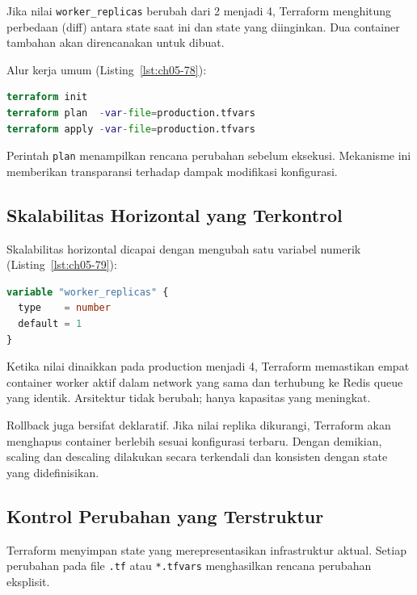 Jika nilai \texttt{worker\_replicas} berubah dari 2 menjadi 4, Terraform menghitung perbedaan (diff) antara state saat ini dan state yang diinginkan. Dua container tambahan akan direncanakan untuk dibuat.

Alur kerja umum (Listing~\ref{lst:ch05-78}):

\begin{lstlisting}[language=terraform, caption={Potongan kode Terraform pada Infrastructure Provisioning Deklaratif (2)}, label={lst:ch05-78}]
terraform init
terraform plan  -var-file=production.tfvars
terraform apply -var-file=production.tfvars
\end{lstlisting}

Perintah \texttt{plan} menampilkan rencana perubahan sebelum eksekusi. Mekanisme ini memberikan transparansi terhadap dampak modifikasi konfigurasi.

\subsection*{Skalabilitas Horizontal yang Terkontrol}

Skalabilitas horizontal dicapai dengan mengubah satu variabel numerik (Listing~\ref{lst:ch05-79}):

\begin{lstlisting}[language=terraform, caption={Potongan kode Terraform pada Skalabilitas Horizontal yang Terkontrol}, label={lst:ch05-79}]
variable "worker_replicas" {
  type    = number
  default = 1
}
\end{lstlisting}

Ketika nilai dinaikkan pada production menjadi 4, Terraform memastikan empat container worker aktif dalam network yang sama dan terhubung ke Redis queue yang identik. Arsitektur tidak berubah; hanya kapasitas yang meningkat.

Rollback juga bersifat deklaratif. Jika nilai replika dikurangi, Terraform akan menghapus container berlebih sesuai konfigurasi terbaru. Dengan demikian, scaling dan descaling dilakukan secara terkendali dan konsisten dengan state yang didefinisikan.

\subsection*{Kontrol Perubahan yang Terstruktur}

Terraform menyimpan state yang merepresentasikan infrastruktur aktual. Setiap perubahan pada file \texttt{.tf} atau \texttt{*.tfvars} menghasilkan rencana perubahan eksplisit.

